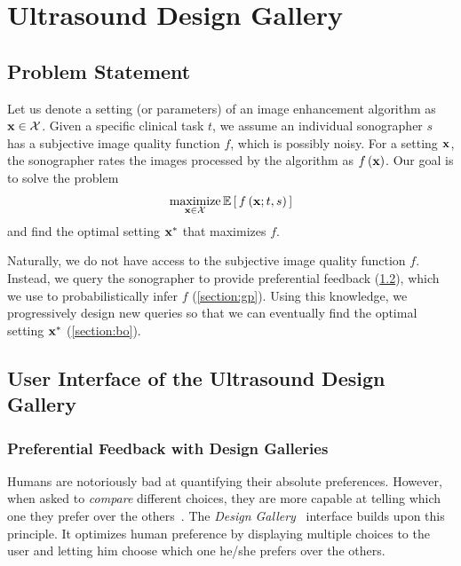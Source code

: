 
\section{Ultrasound Design Gallery}\label{section:usdg}


\subsection{Problem Statement}
Let us denote a setting (or parameters) of an image enhancement algorithm as \(\mathbf{x} \in \mathcal{X}\).
Given a specific clinical task \(t\), we assume an individual sonographer \(s\) has a subjective image quality function \(f\), which is possibly noisy.
For a setting \(\mathbf{x}\), the sonographer rates the images processed by the algorithm as \(f\left(\mathbf{x}\right)\).
Our goal is to solve the problem
%
\begin{align*}
  \operatorname*{maximize}_{\mathbf{x} \in \mathcal{X}} \mathbb{E}\left[\,f\left(\mathbf{x}; t, s \right)\,\right]
\end{align*}
%
and find the optimal setting \(\mathbf{x}^*\) that maximizes \(f\).

Naturally, we do not have access to the subjective image quality function \(f\).
Instead, we query the sonographer to provide preferential feedback (\cref{section:ui}), which we use to probabilistically infer \(f\) (\cref{section:gp}).
Using this knowledge, we progressively design new queries so that we can eventually find the optimal setting \(\mathbf{x}^*\) (\cref{section:bo}).

\subsection{User Interface of the Ultrasound Design Gallery}\label{section:ui}
\subsubsection{Preferential Feedback with Design Galleries}
Humans are notoriously bad at quantifying their absolute preferences.
However, when asked to \textit{compare} different choices, they are more capable at telling which one they prefer over the others~\cite{10.2307/27821441, NIPS2007_b6a1085a}.
The \textit{Design Gallery}~\cite{10.1145/258734.258887} interface builds upon this principle.
It optimizes human preference by displaying multiple choices to the user and letting him choose which one he/she prefers over the others.

